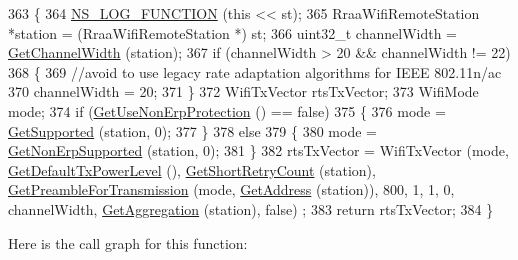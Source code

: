 \begin{DoxyCode}
363 \{
364   \hyperlink{log-macros-disabled_8h_a90b90d5bad1f39cb1b64923ea94c0761}{NS\_LOG\_FUNCTION} (\textcolor{keyword}{this} << st);
365   RraaWifiRemoteStation *station = (RraaWifiRemoteStation *) st;
366   uint32\_t channelWidth = \hyperlink{classns3_1_1WifiRemoteStationManager_a918213c5b9fa629c4986f6d90521bbd4}{GetChannelWidth} (station);
367   \textcolor{keywordflow}{if} (channelWidth > 20 && channelWidth != 22)
368     \{
369       \textcolor{comment}{//avoid to use legacy rate adaptation algorithms for IEEE 802.11n/ac}
370       channelWidth = 20;
371     \}
372   WifiTxVector rtsTxVector;
373   WifiMode mode;
374   \textcolor{keywordflow}{if} (\hyperlink{classns3_1_1WifiRemoteStationManager_a2d3d93f08995e554960a177a52f90f2f}{GetUseNonErpProtection} () == \textcolor{keyword}{false})
375     \{
376       mode = \hyperlink{classns3_1_1WifiRemoteStationManager_a995c8bae0d84b168fd3e8bc9ecaacdd4}{GetSupported} (station, 0);
377     \}
378   \textcolor{keywordflow}{else}
379     \{
380       mode = \hyperlink{classns3_1_1WifiRemoteStationManager_a3df8f1931f1fce653e5990a2821b44c6}{GetNonErpSupported} (station, 0);
381     \}
382   rtsTxVector = WifiTxVector (mode, \hyperlink{classns3_1_1WifiRemoteStationManager_acff2fc859ee6b4c66ea7a83dd075b5d6}{GetDefaultTxPowerLevel} (), 
      \hyperlink{classns3_1_1WifiRemoteStationManager_ad61157a9a56cf668f3255730f6a416b2}{GetShortRetryCount} (station), \hyperlink{classns3_1_1WifiRemoteStationManager_a0f44967cbd7488baada4802ebc642110}{GetPreambleForTransmission} (mode,
       \hyperlink{classns3_1_1WifiRemoteStationManager_ac9ccc8c514bd8d2af05c290e63461a2a}{GetAddress} (station)), 800, 1, 1, 0, channelWidth, \hyperlink{classns3_1_1WifiRemoteStationManager_a5421c8d510cb16eebeac9f2ea9dd73c3}{GetAggregation} (station), \textcolor{keyword}{false})
      ;
383   \textcolor{keywordflow}{return} rtsTxVector;
384 \}
\end{DoxyCode}


Here is the call graph for this function\+:


